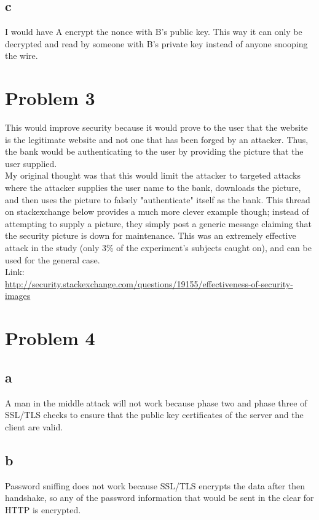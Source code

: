 \documentclass{article}
\begin{document}
\subsection*{c}
I would have A encrypt the nonce with B's public key. This way it can only be decrypted and read by someone with B's private key instead of anyone snooping the wire.\\
\section*{Problem 3}
This would improve security because it would prove to the user that the website is the legitimate website and not one that has been forged by an attacker. Thus, the bank would be authenticating to the user by providing the picture that the user supplied.\\
My original thought was that this would limit the attacker to targeted attacks where the attacker supplies the user name to the bank, downloads the picture, and then uses the picture to falsely "authenticate" itself as the bank. This thread on stackexchange below provides a much more clever example though; instead of attempting to supply a picture, they simply post a generic message claiming that the security picture is down for maintenance. This was an extremely effective attack in the study (only 3\% of the experiment's subjects caught on), and can be used for the general case.\\
Link:\\
\url{http://security.stackexchange.com/questions/19155/effectiveness-of-security-images}

\section*{Problem 4}

\subsection*{a}
A man in the middle attack will not work because phase two and phase three of SSL/TLS checks to ensure that the public key certificates of the server and the client are valid.\\
\subsection*{b}
Password sniffing does not work because SSL/TLS encrypts the data after then handshake, so any of the password information that would be sent in the clear for HTTP is encrypted.\\
\end{document}
